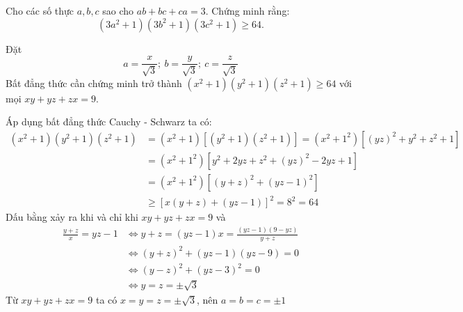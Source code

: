 \begin{problem}
	Cho các số thực $a, b, c$ sao cho $ab + bc + ca = 3$. Chứng minh rằng:
	$$
		(3a^2 + 1)(3b^2 + 1)(3c^2 + 1) \ge 64.
	$$
	\solution

	Đặt 
	$$
		a = \frac{x}{\sqrt{3}};\ b = \frac{y}{\sqrt{3}};\ c = \frac{z}{\sqrt{3}}
	$$
	Bất đẳng thức cần chứng minh trở thành $(x^2 + 1)(y^2 + 1)(z^2 + 1) \ge 64$ với mọi $xy + yz + zx = 9$.

	Áp dụng bất đẳng thức Cauchy - Schwarz ta có:
	\begin{align*}
	(x^2 + 1)(y^2 + 1)(z^2 + 1) &= (x^2 + 1)[(y^2 + 1)(z^2 + 1)] = (x^2 + 1^2)[(yz)^2 + y^2 + z^2 + 1]\\
								&= (x^2 + 1^2)[y^2 + 2yz + z^2 + (yz)^2 - 2yz + 1]\\
								&= (x^2 + 1^2)[(y + z)^2 + (yz - 1)^2]\\
								&\ge [x(y + z) + (yz - 1)]^2 = 8^2 = 64
	\end{align*}
	Dấu bằng xảy ra khi và chỉ khi $xy + yz + zx = 9$ và
	\begin{align*}
		\frac{y + z}{x} = yz - 1
		&\Leftrightarrow y + z = (yz - 1)x = \frac{(yz - 1)(9 - yz)}{y + z} \\ 
		&\Leftrightarrow (y + z)^2 + (yz - 1)(yz - 9) = 0 \\ 
		&\Leftrightarrow (y - z)^2 + (yz - 3)^2 = 0 \\ 
		&\Leftrightarrow y = z = \pm\sqrt{3}
	\end{align*}
	Từ $xy + yz + zx = 9$ ta có $x = y = z = \pm\sqrt{3}$, nên $a = b = c = \pm1$
\end{problem}